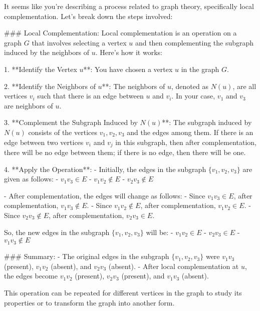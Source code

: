 It seems like you're describing a process related to graph theory, specifically local complementation. Let's break down the steps involved:

### Local Complementation:
Local complementation is an operation on a graph \( G \) that involves selecting a vertex \( u \) and then complementing the subgraph induced by the neighbors of \( u \). Here’s how it works:

1. **Identify the Vertex \( u \)**: You have chosen a vertex \( u \) in the graph \( G \).

2. **Identify the Neighbors of \( u \)**: The neighbors of \( u \), denoted as \( N(u) \), are all vertices \( v_i \) such that there is an edge between \( u \) and \( v_i \). In your case, \( v_1 \) and \( v_3 \) are neighbors of \( u \).

3. **Complement the Subgraph Induced by \( N(u) \)**: The subgraph induced by \( N(u) \) consists of the vertices \( v_1, v_2, v_3 \) and the edges among them. If there is an edge between two vertices \( v_i \) and \( v_j \) in this subgraph, then after complementation, there will be no edge between them; if there is no edge, then there will be one.

4. **Apply the Operation**:
   - Initially, the edges in the subgraph \( \{v_1, v_2, v_3\} \) are given as follows:
     - \( v_1v_3 \in E \)
     - \( v_1v_2 \notin E \)
     - \( v_2v_3 \notin E \)

   - After complementation, the edges will change as follows:
     - Since \( v_1v_3 \in E \), after complementation, \( v_1v_3 \notin E \).
     - Since \( v_1v_2 \notin E \), after complementation, \( v_1v_2 \in E \).
     - Since \( v_2v_3 \notin E \), after complementation, \( v_2v_3 \in E \).

So, the new edges in the subgraph \( \{v_1, v_2, v_3\} \) will be:
- \( v_1v_2 \in E \)
- \( v_2v_3 \in E \)
- \( v_1v_3 \notin E \)

### Summary:
- The original edges in the subgraph \( \{v_1, v_2, v_3\} \) were \( v_1v_3 \) (present), \( v_1v_2 \) (absent), and \( v_2v_3 \) (absent).
- After local complementation at \( u \), the edges become \( v_1v_2 \) (present), \( v_2v_3 \) (present), and \( v_1v_3 \) (absent).

This operation can be repeated for different vertices in the graph to study its properties or to transform the graph into another form.